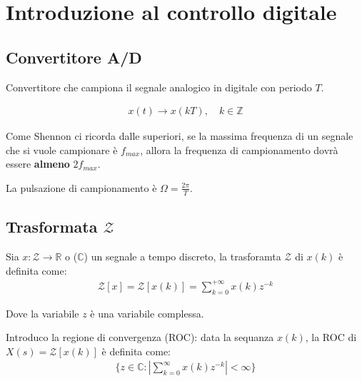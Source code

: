 \chapter{Introduzione al controllo digitale}

\section{Convertitore A/D}

Convertitore che campiona il segnale analogico in digitale con periodo $T$.

\begin{align}
  x(t) \rightarrow x(kT), \quad k \in \mathbb{Z}
\end{align}



Come Shennon ci ricorda dalle superiori, se la massima frequenza di un segnale
che si vuole campionare \`e $f_{max}$, allora la frequenza di campionamento
dovr\`a essere \textbf{almeno} $2f_{max}$.

La pulsazione di campionamento \`e $\Omega = \frac{2\pi}{T}$.

\section{Trasformata $\mathcal{Z}$}

Sia $x: \mathcal{Z} \rightarrow \mathbb{R}$ o ($\mathbb{C}$) un segnale
a tempo discreto, la trasforamta $\mathcal{Z}$ di $x(k)$ \`e definita come:
\begin{align}
  \mathcal{Z}[x] = \mathcal{Z}[x(k)] = \sum_{k=0}^{+\infty} x(k) z^{-k}
\end{align}

Dove la variabile $z$ \`e una variabile complessa.


Introduco la regione di convergenza (ROC): data la sequanza $x(k)$, la ROC 
di $X(s) = \mathcal{Z}[x(k)]$ \`e definita come:
\begin{align}
  \{ z \in \mathbb{C} : | \sum_{k=0}^\infty x(k)z^{-k} | < \infty \}
\end{align}





